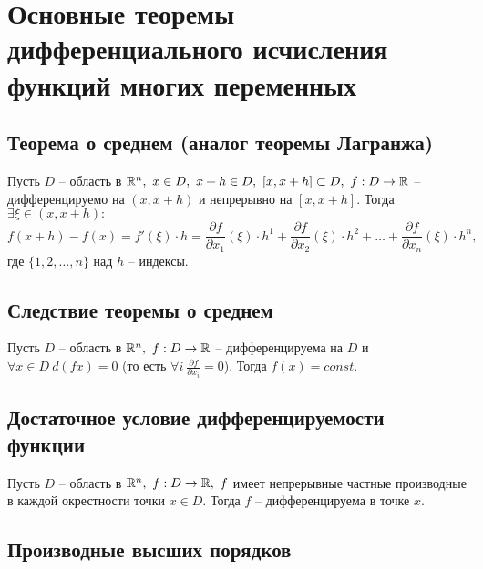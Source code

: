 \section{Основные теоремы дифференциального исчисления функций многих переменных}

\setcounter{subsection}{4}

\subsection{Теорема о среднем (аналог теоремы Лагранжа)}

\begin{theorem}[О среднем]
    Пусть $ D $ -- область в $ \R^n, \ x \in D, \ x + h \in D, \ [x, x+h]\subset D, \ f: D \rightarrow\R $ -- дифференцируемо на $ (x,x+h) $ и непрерывно на $ [x,x+h] $. Тогда $ \exists \xi \in (x,x+h): $
    \[
        f(x+h)-f(x) = f'(\xi)\cdot h = \frac{\partial f}{\partial x_1}(\xi)\cdot h^1 + \frac{\partial f}{\partial x_2}(\xi)\cdot h^2 + \ldots + \frac{\partial f}{\partial x_n}(\xi)\cdot h^n,
    \] где $ \{1,2,\ldots,n\} $ над $ h $ -- индексы.
\end{theorem}

\subsection{Следствие теоремы о среднем}

\begin{corollary}
    Пусть $ D $ -- область в $ \mathbb{R}^n, \ f:D \rightarrow \mathbb{R} $ -- дифференцируема на $ D $ и $ \forall x \in D \ d(fx) = 0 $ (то есть $ \forall i \ \frac{\partial f}{\partial x_i} = 0 $). Тогда $ f(x) = const $.
\end{corollary}

\subsection{Достаточное условие дифференцируемости функции}

\begin{theorem}
    Пусть $ D $ -- область в $ \R^n, \ f:D \rightarrow\R, \ f $ имеет непрерывные частные производные в каждой окрестности точки $ x\in D $. Тогда $ f $ -- дифференцируема в точке $ x $.
\end{theorem}

\subsection{Производные высших порядков}

